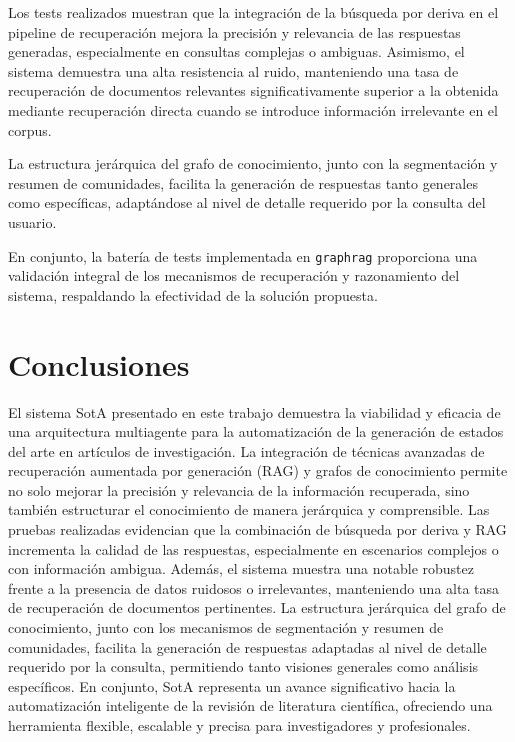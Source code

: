 \documentclass[12pt]{article}
\begin{document}
Los tests realizados muestran que la integración de la búsqueda por deriva en el pipeline de recuperación mejora la precisión y relevancia de las respuestas generadas, especialmente en consultas complejas o ambiguas. Asimismo, el sistema demuestra una alta resistencia al ruido, manteniendo una tasa de recuperación de documentos relevantes significativamente superior a la obtenida mediante recuperación directa cuando se introduce información irrelevante en el corpus.

La estructura jerárquica del grafo de conocimiento, junto con la segmentación y resumen de comunidades, facilita la generación de respuestas tanto generales como específicas, adaptándose al nivel de detalle requerido por la consulta del usuario.

En conjunto, la batería de tests implementada en \texttt{graphrag} proporciona una validación integral de los mecanismos de recuperación y razonamiento del sistema, respaldando la efectividad de la solución propuesta.

\section{Conclusiones}
El sistema SotA presentado en este trabajo demuestra la viabilidad y eficacia de una arquitectura multiagente para la automatización de la generación de estados del arte en artículos de investigación. La integración de técnicas avanzadas de recuperación aumentada por generación (RAG) y grafos de conocimiento permite no solo mejorar la precisión y relevancia de la información recuperada, sino también estructurar el conocimiento de manera jerárquica y comprensible.
Las pruebas realizadas evidencian que la combinación de búsqueda por deriva y RAG incrementa la calidad de las respuestas, especialmente en escenarios complejos o con información ambigua. Además, el sistema muestra una notable robustez frente a la presencia de datos ruidosos o irrelevantes, manteniendo una alta tasa de recuperación de documentos pertinentes.
La estructura jerárquica del grafo de conocimiento, junto con los mecanismos de segmentación y resumen de comunidades, facilita la generación de respuestas adaptadas al nivel de detalle requerido por la consulta, permitiendo tanto visiones generales como análisis específicos.
En conjunto, SotA representa un avance significativo hacia la automatización inteligente de la revisión de literatura científica, ofreciendo una herramienta flexible, escalable y precisa para investigadores y profesionales.
\end{document}
